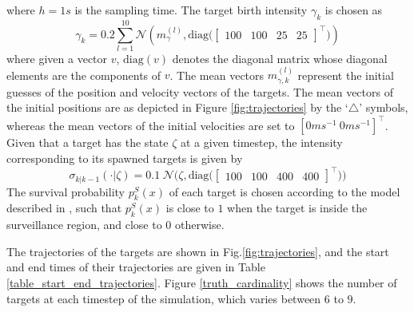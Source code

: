 where $h=1s$ is the sampling time. The target birth intensity $\gamma_k$ is chosen as
\begin{equation}
    \gamma _k =  0.2 \sum_{l=1}^{10}\mathcal N\left(m_{\gamma}^{(l)}, \textrm{diag}\big(\begin{bmatrix} 100 & 100 & 25 & 25\end{bmatrix}^\intercal\big)\right)
\end{equation}
where given a vector $v$, $\textrm{diag}(v)$ denotes the diagonal matrix whose diagonal elements are the components of $v$.
The mean vectors $m_{\gamma, k}^{(l)}$ represent the initial guesses of the position and velocity vectors of the targets. The mean vectors of the initial positions are as depicted in Figure \ref{fig:trajectories} by the `$\triangle$' symbols, whereas the mean vectors of the initial velocities are set to $[0ms^{-1}\ 0ms^{-1}]^\intercal$.
Given that a target has the state $\zeta$ at a given timestep, the intensity corresponding to its spawned targets is given by
\begin{equation}
    \sigma_{k|k-1}(\cdot \vert \zeta) =  0.1\hspace{3pt}\mathcal N\Big(\zeta, \text{diag}\big(\begin{bmatrix} 100 & 100 & 400 & 400 \end{bmatrix}^\intercal\big)\Big)
\end{equation}
The survival probability $p_{k}^S(x)$ of each target is chosen according to the model described in \cite{sun2023gaussian}, such that $p_{k}^S(x)$ is close to $1$ when the target is inside the surveillance region, and close to $0$ otherwise. 


The trajectories of the targets are shown in Fig.\ref{fig:trajectories}, and the start and end times of their trajectories are given in Table \ref{table_start_end_trajectories}. Figure \ref{truth_cardinality} shows the number of targets at each timestep of the simulation, which varies between $6$ to $9$.

